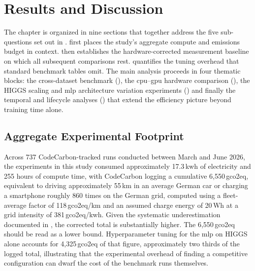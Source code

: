 \chapter{Results and Discussion}
\label{results}
The chapter is organized in nine sections that together address the five sub-questions set out in .  first places the study's aggregate compute and emissions budget in context.  then establishes the hardware-corrected measurement baseline on which all subsequent comparisons rest.  quantifies the tuning overhead that standard benchmark tables omit. The main analysis proceeds in four thematic blocks: the cross-dataset benchmark (), the \gls{cpu}--\gls{gpu} hardware comparison (), the HIGGS scaling and \gls{mlp} architecture variation experiments () and finally the temporal and lifecycle analyses () that extend the efficiency picture beyond training time alone.


\section{Aggregate Experimental Footprint}
\label{sec:results_scope}

Across 737 CodeCarbon-tracked runs conducted between March and June 2026, the experiments in this study consumed approximately 17.3\,\gls{kwh} of electricity and 255 hours of compute time, with CodeCarbon logging a cumulative 6{,}550\,\gls{gco2eq}, equivalent to driving approximately 55\,km in an average German car or charging a smartphone roughly 860 times on the German grid, computed using a fleet-average factor of 118\,\gls{gco2eq}/km \parencite{europeanenvironmentagencyMonitoringCO2Emissions2025} and an assumed charge energy of 20\,Wh at a grid intensity of 381\,\gls{gco2eq}/\gls{kwh}. Given the systematic underestimation documented in , the corrected total is substantially higher. The 6{,}550\,\gls{gco2eq} should be read as a lower bound. Hyperparameter tuning for the \gls{mlp} on HIGGS alone accounts for 4{,}325\,\gls{gco2eq} of that figure, approximately two thirds of the logged total, illustrating that the experimental overhead of finding a competitive configuration can dwarf the cost of the benchmark runs themselves.

